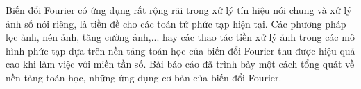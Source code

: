 \par Biến đổi Fourier có ứng dụng rất rộng rãi trong xử lý tín hiệu nói chung và xử lý ảnh số nói riêng, là tiền đề cho các toán tử phức tạp hiện tại. Các phương pháp lọc ảnh, nén ảnh, tăng cường ảnh,... hay các thao tác tiền xử lý ảnh trong các mô hình phức tạp dựa trên nền tảng toán học của biến đổi Fourier thu được hiệu quả cao khi làm việc với miền tần số. Bài báo cáo đã trình bày một cách tổng quát về nền tảng toán học, những ứng dụng cơ bản của biến đổi Fourier.
